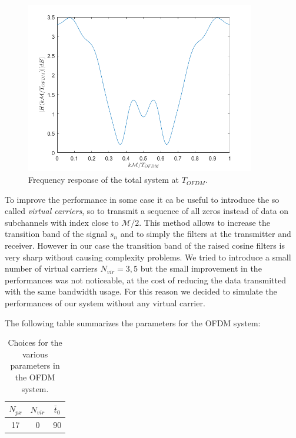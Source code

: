\documentclass[a4paper,11.5pt]{article}
\begin{document}
\begin{figure}[H]
	\begin{center}   
		\includegraphics[width=10cm]{figs/H_mag.png} 
		\caption{Frequency response of the total system at $T_{OFDM}$.}
		\label{fig:H}
	\end{center}
\end{figure}


To improve the performance in some case it ca be useful to introduce the so called \emph{virtual carriers}, so to transmit a sequence of all zeros instead of data on subchannels with index close to $\mathcal{M}/2$. This method allows to increase the transition band of the signal $s_n$ and to simply the filters at the transmitter and receiver. However in our case the transition band of the raised cosine filters is very sharp without causing complexity problems. We tried to introduce a small number of virtual carriers $N_{vir} = 3,5$ but the small improvement in the performances was not noticeable, at the cost of reducing the data transmitted with the same bandwidth usage. For this reason we decided to simulate the performances of our system without any virtual carrier.

The following table summarizes the parameters for the OFDM system:

\begin{table}[htbp]
	\begin{center}
		\begin{tabular}{ccc}
			\toprule
			$N_{px}$ & $N_{vir}$ &$\bar{t}_0$ \\
			\midrule
			17 & 0 &90 \\
			\bottomrule
		\end{tabular}
	\end{center}
	\label{tab:sumup2}
	\caption{Choices for the various parameters in the OFDM system.}
\end{table} 
\end{document}
